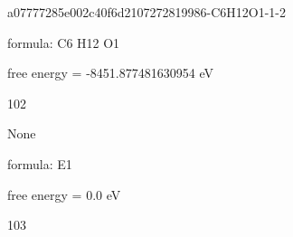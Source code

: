 \documentclass{article}
\begin{document}
\vspace{1cm}


a07777285e002c40f6d2107272819986-C6H12O1-1-2



formula: C6 H12 O1



free energy = -8451.877481630954 eV

102

\vspace{1cm}


None



formula: E1



free energy = 0.0 eV

103

\vspace{1cm}
\end{document}
